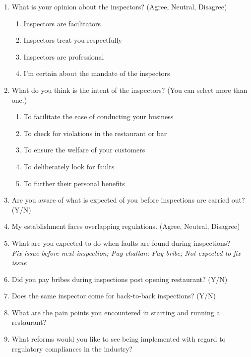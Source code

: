 \documentclass[a4paper, 12pt]{article}
\begin{document}
\begin{mdframed}[backgroundcolor=gray!20]
		\begin {enumerate}[nosep]
		\item What is your opinion about the inspectors? (Agree, Neutral, Disagree)
			\begin {enumerate}[nosep]
			\item Inspectors are facilitators
			\item Inspectors treat you respectfully
			\item Inspectors are professional
			\item I’m certain about the mandate of the inspectors
			\end {enumerate}
		\item What do you think is the intent of the inspectors? (You can select more than one.)
			\begin {enumerate}[nosep]
			\item To facilitate the ease of conducting your business
			\item To check for violations in the restaurant or bar
			\item To ensure the welfare of your customers
			\item To deliberately look for faults
			\item To further their personal benefits
			\end {enumerate}
		\item Are you aware of what is expected of you before inspections are carried out?(Y/N)
		\item My establishment faces overlapping regulations. (Agree, Neutral, Disagree)
		\item What are you expected to do when faults are found during inspections?\\
		\textit{Fix issue before next inspection; Pay challan; Pay bribe; Not expected to fix issue}
		\item Did you pay bribes during inspections post opening restaurant? (Y/N)
		\item Does the same inspector come for back-to-back inspections? (Y/N)
		\item What are the pain points you encountered in starting and running a restaurant?
		\item What reforms would you like to see being implemented with regard to regulatory compliances in the industry?
		\end {enumerate}
		  \end{mdframed}
       

                    
                    
                    
\end{document}
